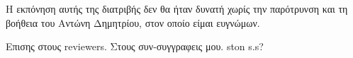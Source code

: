 Η εκπόνηση αυτής της διατριβής δεν θα ήταν δυνατή χωρίς την παρότρυνση και τη
βοήθεια του Αντώνη Δημητρίου, στον οποίο είμαι ευγνώμων.

Επισης στους reviewers. Στους συν-συγγραφεις μου. ston s.s?
